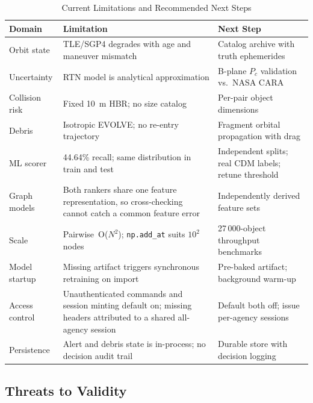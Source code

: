 \documentclass[conference]{IEEEtran}
\newcommand{\Pc}{P_c}
\begin{document}
\begin{table}[h]
\caption{Current Limitations and Recommended Next Steps}
\label{tab:limits}
\centering
\footnotesize
\begin{tabular}{@{}p{1.5cm}p{3.0cm}p{2.7cm}@{}}
\toprule
\textbf{Domain} & \textbf{Limitation} & \textbf{Next Step} \\
\midrule
Orbit state   & TLE/SGP4 degrades with age and maneuver mismatch
              & Catalog archive with truth ephemerides \\
Uncertainty   & RTN model is analytical approximation
              & B-plane $\Pc$ validation vs.\ NASA CARA \\
Collision risk & Fixed 10~m HBR; no size catalog
              & Per-pair object dimensions \\
Debris        & Isotropic EVOLVE; no re-entry trajectory
              & Fragment orbital propagation with drag \\
ML scorer     & 44.64\% recall; same distribution in train and test
              & Independent splits; real CDM labels; retune threshold \\
Graph models  & Both rankers share one feature representation, so
              cross-checking cannot catch a common feature error
              & Independently derived feature sets \\
Scale         & Pairwise~O($N^2$); \texttt{np.add\_at} suits $10^2$ nodes
              & 27\,000-object throughput benchmarks \\
Model startup & Missing artifact triggers synchronous retraining on import
              & Pre-baked artifact; background warm-up \\
Access control & Unauthenticated commands and session minting default on;
              missing headers attributed to a shared all-agency session
              & Default both off; issue per-agency sessions \\
Persistence   & Alert and debris state is in-process; no decision audit trail
              & Durable store with decision logging \\
\bottomrule
\end{tabular}
\end{table}

\subsection{Threats to Validity}
\end{document}
